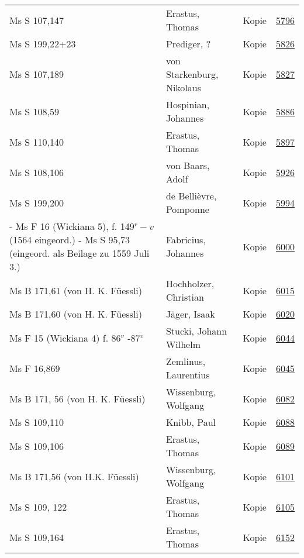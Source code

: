 \documentclass[10pt,a4paper,landscape]{report}
\begin{document}
\begin{longtable}{p{16cm}p{4cm}lr}
Ms S 107,147	&	Erastus, Thomas	&	Kopie	&	\href{http://130.60.24.72/assignment/5796}{5796}\\
Ms S 199,22+23	&	Prediger, ?	&	Kopie	&	\href{http://130.60.24.72/assignment/5826}{5826}\\
Ms S 107,189	&	von Starkenburg, Nikolaus	&	Kopie	&	\href{http://130.60.24.72/assignment/5827}{5827}\\
Ms S 108,59	&	Hospinian, Johannes	&	Kopie	&	\href{http://130.60.24.72/assignment/5886}{5886}\\
Ms S 110,140	&	Erastus, Thomas	&	Kopie	&	\href{http://130.60.24.72/assignment/5897}{5897}\\
Ms S 108,106	&	von Baars, Adolf	&	Kopie	&	\href{http://130.60.24.72/assignment/5926}{5926}\\
Ms S 199,200	&	de Bellièvre, Pomponne	&	Kopie	&	\href{http://130.60.24.72/assignment/5994}{5994}\\
- Ms F 16 (Wickiana 5), f. 149$^r-v$ (1564 eingeord.) - Ms S 95,73 (eingeord. als Beilage zu 1559 Juli 3.)	&	Fabricius, Johannes	&	Kopie	&	\href{http://130.60.24.72/assignment/6000}{6000}\\
Ms B 171,61 (von H. K. Füessli)	&	Hochholzer, Christian	&	Kopie	&	\href{http://130.60.24.72/assignment/6015}{6015}\\
Ms B 171,60 (von H. K. Füessli)	&	Jäger, Isaak	&	Kopie	&	\href{http://130.60.24.72/assignment/6020}{6020}\\
Ms F 15 (Wickiana 4) f. 86$^v$ -87$^v$	&	Stucki, Johann Wilhelm	&	Kopie	&	\href{http://130.60.24.72/assignment/6044}{6044}\\
Ms F 16,869	&	Zemlinus, Laurentius	&	Kopie	&	\href{http://130.60.24.72/assignment/6045}{6045}\\
Ms B 171, 56 (von H. K. Füessli)	&	Wissenburg, Wolfgang	&	Kopie	&	\href{http://130.60.24.72/assignment/6082}{6082}\\
Ms S 109,110	&	Knibb, Paul	&	Kopie	&	\href{http://130.60.24.72/assignment/6088}{6088}\\
Ms S 109,106	&	Erastus, Thomas	&	Kopie	&	\href{http://130.60.24.72/assignment/6089}{6089}\\
Ms B 171,56 (von H.K. Füessli)	&	Wissenburg, Wolfgang	&	Kopie	&	\href{http://130.60.24.72/assignment/6101}{6101}\\
Ms S 109, 122	&	Erastus, Thomas	&	Kopie	&	\href{http://130.60.24.72/assignment/6105}{6105}\\
Ms S 109,164	&	Erastus, Thomas	&	Kopie	&	\href{http://130.60.24.72/assignment/6152}{6152}\\

\end{longtable}
\end{document}
